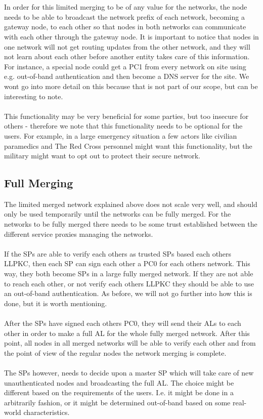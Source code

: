 \noindent
\\\\
In order for this limited merging to be of any value for the networks, the node needs to be able to broadcast the network prefix of each network, becoming a gateway node, to each other so that nodes in both networks can communicate with each other through the gateway node. It is important to notice that nodes in one network will not get routing updates from the other network, and they will not learn about each other before another entity takes care of this information. For instance, a special node could get a PC1 from every network on site using e.g. out-of-band authentication and then become a DNS server for the site. We wont go into more detail on this because that is not part of our scope, but can be interesting to note.
\\\\
This functionality may be very beneficial for some parties, but too insecure for others - therefore we note that this functionality needs to be optional for the users. For example, in a large emergency situation a few actors like civilian paramedics and The Red Cross personnel might want this functionality, but the military might want to opt out to protect their secure network.


\subsection{Full Merging}\label{full_merging}
The limited merged network explained above does not scale very well, and should only be used temporarily until the networks can be fully merged. For the networks to be fully merged there needs to be some trust established between the different service proxies managing the networks. 
\\\\
If the SPs are able to verify each others as trusted SPs based each others LLPKC, then each SP can sign each other a PC0 for each others network. This way, they both become SPs in a large fully merged network. If they are not able to reach each other, or not verify each others LLPKC they should be able to use an out-of-band authentication. As before, we will not go further into how this is done, but it is worth mentioning.
\\\\
After the SPs have signed each others PC0, they will send their ALs to each other in order to make a full AL for the whole fully merged network. After this point, all nodes in all merged networks will be able to verify each other and from the point of view of the regular nodes the network merging is complete.
\\\\
The SPs however, needs to decide upon a master SP which will take care of new unauthenticated nodes and broadcasting the full AL. The choice might be different based on the requirements of the users. I.e. it might be done in a arbitrarily fashion, or it might be determined out-of-band based on some real-world characteristics.



